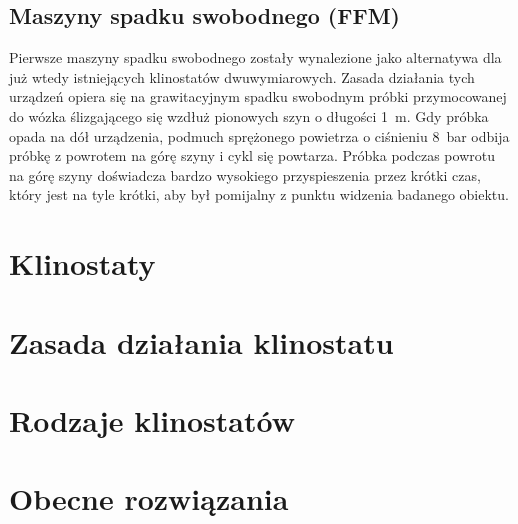 \subsection{Maszyny spadku swobodnego (FFM)}

Pierwsze maszyny spadku swobodnego zostały wynalezione jako alternatywa dla już wtedy istniejących klinostatów dwuwymiarowych. Zasada działania tych urządzeń opiera się na grawitacyjnym spadku swobodnym próbki przymocowanej do wózka ślizgającego się wzdłuż pionowych szyn o długości \SI{1}{m}. Gdy próbka opada na dół urządzenia, podmuch sprężonego powietrza o ciśnieniu \SI{8}{bar} odbija próbkę z powrotem na górę szyny i cykl się powtarza. Próbka podczas powrotu na górę szyny doświadcza bardzo wysokiego przyspieszenia przez krótki czas, który jest na tyle krótki, aby był pomijalny z punktu widzenia badanego obiektu.

\section{Klinostaty}


\section{Zasada działania klinostatu}

\section{Rodzaje klinostatów}

\section{Obecne rozwiązania}